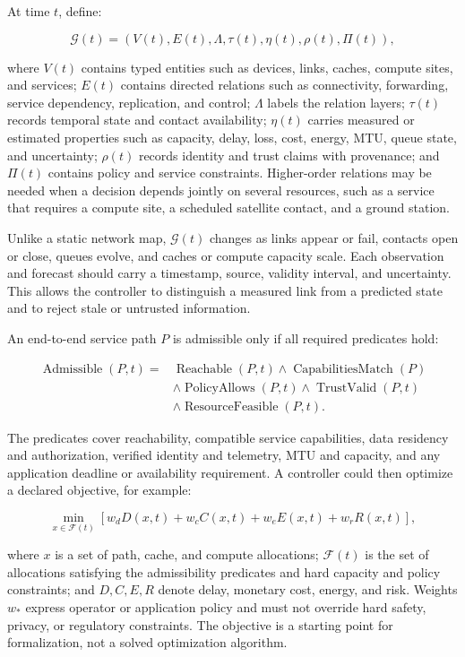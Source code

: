 \documentclass[
  american,
  11pt,
]{article}
\begin{document}
At time \(t\), define:

\[\mathcal{G}(t) =
\left(V(t), E(t), \Lambda, \tau(t), \eta(t), \rho(t), \Pi(t)\right),\]

where \(V(t)\) contains typed entities such as devices, links, caches,
compute sites, and services; \(E(t)\) contains directed relations such
as connectivity, forwarding, service dependency, replication, and
control; \(\Lambda\) labels the relation layers; \(\tau(t)\) records
temporal state and contact availability; \(\eta(t)\) carries measured or
estimated properties such as capacity, delay, loss, cost, energy, MTU,
queue state, and uncertainty; \(\rho(t)\) records identity and trust
claims with provenance; and \(\Pi(t)\) contains policy and service
constraints. Higher-order relations may be needed when a decision
depends jointly on several resources, such as a service that requires a
compute site, a scheduled satellite contact, and a ground station.

Unlike a static network map, \(\mathcal{G}(t)\) changes as links appear
or fail, contacts open or close, queues evolve, and caches or compute
capacity scale. Each observation and forecast should carry a timestamp,
source, validity interval, and uncertainty. This allows the controller
to distinguish a measured link from a predicted state and to reject
stale or untrusted information.

An end-to-end service path \(P\) is admissible only if all required
predicates hold:

\[\begin{aligned}
\operatorname{Admissible}(P,t) ={}&
  \operatorname{Reachable}(P,t)
  \land \operatorname{CapabilitiesMatch}(P) \\
 &\land \operatorname{PolicyAllows}(P,t)
  \land \operatorname{TrustValid}(P,t) \\
 &\land \operatorname{ResourceFeasible}(P,t).
\end{aligned}\]

The predicates cover reachability, compatible service capabilities, data
residency and authorization, verified identity and telemetry, MTU and
capacity, and any application deadline or availability requirement. A
controller could then optimize a declared objective, for example:

\[\min_{x \in \mathcal{F}(t)}
\left[
w_d D(x,t)+w_c C(x,t)+w_e E(x,t)+w_r R(x,t)
\right],\]

where \(x\) is a set of path, cache, and compute allocations;
\(\mathcal{F}(t)\) is the set of allocations satisfying the
admissibility predicates and hard capacity and policy constraints; and
\(D,C,E,R\) denote delay, monetary cost, energy, and risk. Weights
\(w_*\) express operator or application policy and must not override
hard safety, privacy, or regulatory constraints. The objective is a
starting point for formalization, not a solved optimization algorithm.
\end{document}
